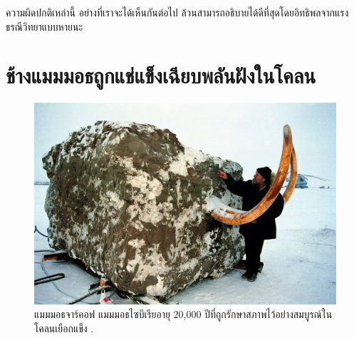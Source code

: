 \documentclass[10pt,twocolumn,letterpaper]{article}
\begin{document}
ความผิดปกติเหล่านี้ อย่างที่เราจะได้เห็นกันต่อไป ล้วนสามารถอธิบายได้ดีที่สุดโดยอิทธิพลจากแรงธรณีวิทยาแบบหายนะ

\section{ช้างแมมมอธถูกแช่แข็งเฉียบพลันฝังในโคลน}
\begin{figure}[t]
\begin{center}
   \includegraphics[width=1\linewidth]{jarkov-mammoth.jpg}
\end{center}
   \caption{แมมมอธจาร์คอฟ แมมมอธไซบีเรียอายุ 20,000 ปีที่ถูกรักษาสภาพไว้อย่างสมบูรณ์ในโคลนเยือกแข็ง \cite{51}.}
\label{fig:1}
\label{fig:onecol}
\end{figure}
\end{document}
